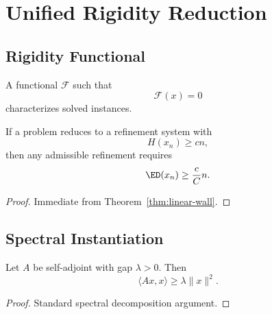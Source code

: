 \chapter{Unified Rigidity Reduction}

\section{Rigidity Functional}

\begin{definition}
A functional $\mathcal{F}$ such that
\[
\mathcal{F}(x)=0
\]
characterizes solved instances.
\end{definition}

\begin{theorem}
If a problem reduces to a refinement system with
\[
H(x_n) \ge c n,
\]
then any admissible refinement requires
\[
\ED(x_n) \ge \frac{c}{C} n.
\]
\end{theorem}

\begin{proof}
Immediate from Theorem~\ref{thm:linear-wall}.
\end{proof}

\section{Spectral Instantiation}

\begin{theorem}
Let $A$ be self-adjoint with gap $\lambda>0$. Then
\[
\langle Ax,x\rangle \ge \lambda \|x\|^2.
\]
\end{theorem}

\begin{proof}
Standard spectral decomposition argument.
\end{proof}
